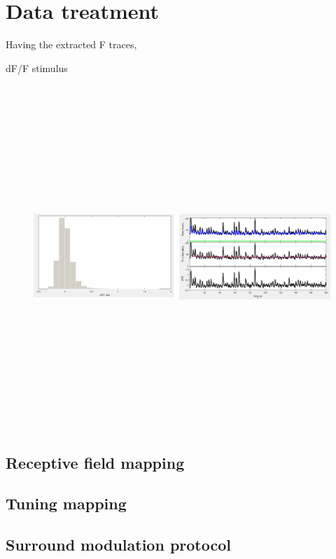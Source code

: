 \section{Data treatment}
\label{sec:DataTreatment}

Having the extracted F traces, 

dF/F
stimulus

\begin{figure}[H] \centering \includegraphics[width=13cm,height=13cm,keepaspectratio]{Figures/7.Results/ftraces/dFoverF.png} 
\end{figure}


\subsection{Receptive field mapping}
\label{subsec:subasectionC}

\subsection{Tuning mapping}
\label{subsec:subbsectionC}

\subsection{Surround modulation protocol}
\label{subsec:subcsectionC}